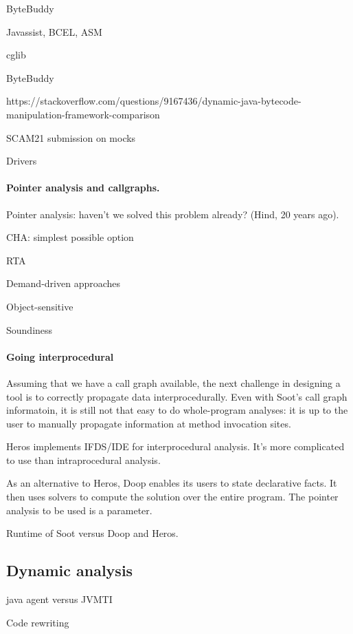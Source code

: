 ByteBuddy

Javassist, BCEL, ASM

cglib

ByteBuddy



https://stackoverflow.com/questions/9167436/dynamic-java-bytecode-manipulation-framework-comparison



SCAM21 submission on mocks


Drivers

\paragraph{Pointer analysis and callgraphs.}

Pointer analysis: haven't we solved this problem already? (Hind, 20 years ago).

CHA: simplest possible option

RTA

Demand-driven approaches

Object-sensitive

Soundiness

\paragraph{Going interprocedural}
Assuming that we have a call graph available, the next challenge in
designing a tool is to correctly propagate data interprocedurally.
Even with Soot's call graph informatoin, it is still not that easy to
do whole-program analyses: it is up to the user to manually propagate
information at method invocation sites.

Heros implements IFDS/IDE for interprocedural analysis.
It's more complicated to use than intraprocedural analysis.

As an alternative to Heros, Doop enables its users to state
declarative facts. It then uses solvers to compute the solution over the
entire program. The pointer analysis to be used is a parameter.

Runtime of Soot versus Doop and Heros.


\subsection{Dynamic analysis}

java agent versus JVMTI

Code rewriting

